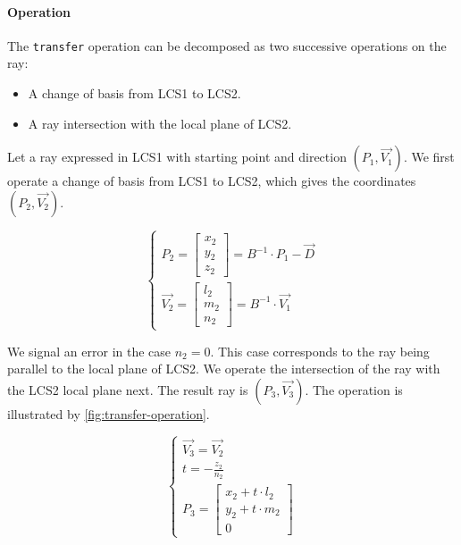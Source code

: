 \paragraph{Operation}
The \lstinline{transfer} operation can be decomposed as two successive
operations on the ray:

\begin{itemize}
\item A change of basis from LCS1 to LCS2.
\item A ray intersection with the local plane of LCS2.
\end{itemize}

Let a ray expressed in LCS1 with starting point and direction
$(P_1, \overrightarrow{V_1})$. We first operate a change of basis from LCS1
to LCS2, which gives the coordinates $(P_2, \overrightarrow{V_2})$.

\begin{equation} \begin{cases}
P_2 = \begin{bmatrix} x_2 \\ y_2 \\ z_2 \end{bmatrix}
    = B^{-1} \cdot P_1 - \overrightarrow{D} \\
\overrightarrow{V_2} = \begin{bmatrix} l_2 \\ m_2 \\ n_2 \end{bmatrix}
  = B^{-1} \cdot \overrightarrow{V_1}
\end{cases} \end{equation}

We signal an error in the case $n_2 = 0$. This case corresponds to the
ray being parallel to the local plane of LCS2. We operate the intersection
of the ray with the LCS2 local plane next. The result ray is
$(P_3, \overrightarrow{V_3})$. The operation is illustrated by
\cref{fig:transfer-operation}.

\begin{equation} \begin{cases}
\overrightarrow{V_3} = \overrightarrow{V_2} \\
t = - \frac{z_2}{n_2} \\
P_3 = \begin{bmatrix} x_2 + t \cdot l_2 \\
                      y_2 + t \cdot m_2 \\
                      0 \end{bmatrix}
\end{cases} \end{equation}

